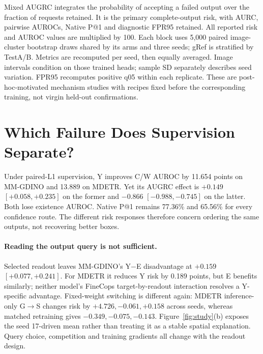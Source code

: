 \documentclass[10pt,twocolumn,letterpaper]{article}
\begin{document}
Mixed AUGRC integrates the probability of accepting a failed output over
the fraction of requests retained. It is the primary complete-output risk,
with AURC, pairwise AUROCs,
Native P@1 and diagnostic FPR95 retained. All reported risk and AUROC values
are multiplied by 100. Each block uses 5,000 paired image-cluster bootstrap
draws shared by its arms and three seeds; gRef is stratified by TestA/B.
Metrics are recomputed per seed, then equally averaged. Image intervals
condition on those trained heads; sample SD separately describes seed variation.
FPR95 recomputes positive q05 within each replicate. These are post-hoc-motivated
mechanism studies with recipes fixed before the corresponding training,
not virgin held-out confirmations.

\section{Which Failure Does Supervision Separate?}

Under paired-L1 supervision, Y improves C/W AUROC by 11.654 points on
MM-GDINO and 13.889 on MDETR. Yet its AUGRC effect is $+0.149$
$[+0.058,+0.235]$ on the former and $-0.866$ $[-0.988,-0.745]$ on the
latter. Both lose existence AUROC. Native P@1 remains 77.36\% and 65.56\%
for every confidence route. The different risk responses therefore concern
ordering the same outputs, not recovering better boxes.

\paragraph{Reading the output query is not sufficient.}
Selected readout leaves MM-GDINO's Y$-$E disadvantage at $+0.159$
$[+0.077,+0.241]$. For MDETR it reduces Y risk by 0.189 points, but E benefits
similarly; neither model's FineCops target-by-readout interaction resolves
a Y-specific advantage. Fixed-weight switching is different again:
MDETR inference-only G$\rightarrow$S changes risk by $+4.726,-0.061,+0.158$
across seeds, whereas matched retraining gives $-0.349,-0.075,-0.143$.
Figure~\ref{fig:study}(b) exposes the seed 17-driven mean rather than treating
it as a stable spatial explanation. Query choice, competition and training
gradients all change with the readout design.
\end{document}
